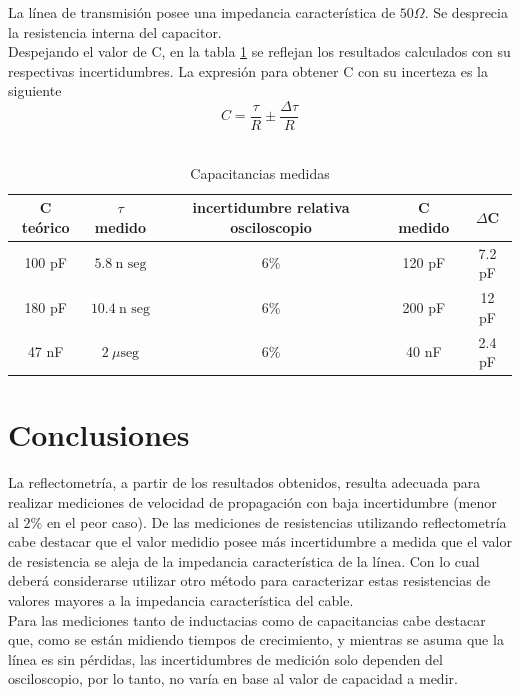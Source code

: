 \documentclass[a4paper,10pt]{article}
\begin{document}
	\indent La línea de transmisión posee una impedancia característica de 
	$50\Omega$. Se desprecia la resistencia interna del capacitor. \\
	\indent Despejando el valor de C, en la tabla \ref{tab002} se reflejan los 
	resultados calculados con su respectivas incertidumbres. La expresi\'on para obtener C con su incerteza es la siguiente
	\begin{equation}
				C = \frac{\tau}{R}\pm \frac{\Delta\tau}{R}
			\end{equation}
	 \\

		\begin{table}[!htp]
			\centering
			\begin{tabular}{|c|c|c|c|c|}
				\hline
    			C teórico & $\tau$ medido & incertidumbre relativa osciloscopio 
				& C medido & $\Delta$C \\
				\hline
				100 pF & $5.8~\text{n seg}$ & 6\% & 120 pF & 7.2 pF \\
				\hline 
				180 pF & $10.4~\text{n seg}$ & 6\% & 200 pF & 12 pF \\
				\hline
				47 nF & $2~\mu\text{seg}$ & 6\% & 40 nF & 2.4 pF \\
				\hline
			\end{tabular}
			\caption{Capacitancias medidas} 
			\label{tab002} 
		\end{table}

	\newpage
	\section{Conclusiones}
	\indent La reflectometría, a partir de los resultados obtenidos, resulta adecuada para realizar mediciones de velocidad de propagaci\'on con baja incertidumbre (menor al $2 \%$ en el peor caso).
	\indent De las mediciones de resistencias utilizando reflectometría cabe 
	destacar que el valor medidio posee más incertidumbre a medida que el 
	valor de resistencia se aleja de la impedancia característica de la línea. Con lo cual deber\'a considerarse utilizar otro m\'etodo para caracterizar estas resistencias de valores mayores a la impedancia caracter\'istica del cable.
	\\
	\indent Para las mediciones tanto de inductacias como de capacitancias 
	cabe destacar que, como se están midiendo tiempos de crecimiento, y 
	mientras se	asuma que la línea es sin pérdidas, las incertidumbres de 
	medición solo dependen del osciloscopio, por lo tanto, no varía en base al
	valor de capacidad a medir.\\
\end{document}
